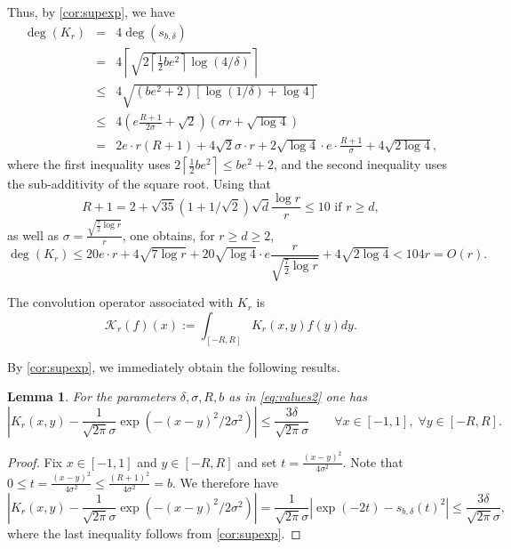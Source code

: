 \documentclass[11pt]{article}
\newtheorem{lemma}[defin]{Lemma}
\theoremstyle{definition}
\begin{document}
Thus, by \cref{cor:supexp}, we have
\begin{eqnarray*}
    \deg(K_r) &=& 4\deg(s_{b,\delta}) \\
    &=&  4\left\lceil\sqrt{2\left\lceil \frac{1}{2}be^2\right\rceil\log (4/\delta)} \right\rceil \\
    &\le & 4\sqrt{(be^2+2)[\log(1/\delta)+\log 4]} \\
    &\le& 4\left(e\frac{R+1}{ {2}\sigma}+\sqrt{2}\right)(\sigma r + \sqrt{\log 4}) \\
    &=& {2}e\cdot r(R+1) +4\sqrt{2}\sigma \cdot r + {2}\sqrt{\log 4}\cdot e\cdot \frac{R+1}{\sigma} + {4}\sqrt{2\log 4},
\end{eqnarray*}
{where the first inequality uses $2\left\lceil \frac{1}{2}be^2\right\rceil \le be^2+2$, and the second inequality uses the sub-additivity of the square root.}
Using that
\[
R+1 = 2+ \sqrt{35}(1 + 1/\sqrt{2})\sqrt{d}\frac{\log r}{r} \le 10 \mbox{ if $r \ge d$},
\]
as well as $\sigma = \frac{\sqrt{\frac{7}{2}\log r}}{r}$,
one obtains, for $r \ge d {\ge 2}$,
\begin{equation}
\label{eq:Kr_degree_bound}
    \deg(K_r) \le {20}e\cdot r +4\sqrt{7\log r} + {20\sqrt{\log 4}}\cdot e\frac{r}{\sqrt{\frac{7}{2}\log r}} + {4}\sqrt{2\log 4}
    <  {104r} = O(r).
\end{equation}






The  convolution operator associated with $K_r$ is
\[
 \mathcal{K}_r (f)(x) := \int_{[-R,R]} K_r(x,y)f(y)dy.
\]



By \cref{cor:supexp}, we immediately obtain the following results.
\begin{lemma} \label{lem:pointwise Kr vs exp}
For the parameters $\delta,\sigma, R, b$ as in \cref{eq:values2} one has
    \[
\left| K_r(x,y) - \frac{1}{\sqrt{2\pi}\sigma}\exp{\left(-(x-y)^2/2\sigma^2\right)} \right| \leq \frac{3\delta}{\sqrt{2\pi}\sigma}
\qquad \forall x \in [-1,1], \; \forall y \in [-R,R].
\]
\end{lemma}
\begin{proof}
Fix $x \in [-1,1]$ and $y \in [-R,R]$ and set $t = \frac{(x-y)^2}{4 \sigma^2}$. Note that $0 \leq t = \frac{(x-y)^2}{4 \sigma^2} \leq \frac{(R+1)^2}{4 \sigma^2} = b$. We therefore have
\[
\left|K_r(x,y) - \frac{1}{\sqrt{2\pi}\sigma}\exp{\left(-(x-y)^2/2\sigma^2\right)}\right| = \frac{1}{\sqrt{2\pi}\sigma} |\exp(-2t)- s_{b,\delta}(t)^2| \leq \frac{3\delta}{\sqrt{2\pi}\sigma},
\]
where the last inequality follows from \cref{cor:supexp}.
\end{proof}
\end{document}
